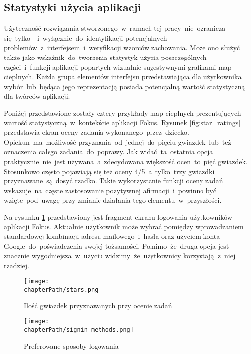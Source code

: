 \subsection{Statystyki użycia aplikacji}
Użyteczność rozwiązania stworzonego~w~ramach tej pracy~nie~ogranicza się~tylko~~i~wyłącznie~do~identyfikacji potencjalnych problemów~z~interfejsem~i~weryfikacji wzorców zachowania. Może ono służyć także jako wskaźnik~do~tworzenia statystyk użycia poszczególnych części~i~funkcji aplikacji popartych wizualnie sugestywnymi grafikami map cieplnych. Każda grupa elementów interfejsu przedstawiająca dla użytkownika wybór~lub~będąca jego reprezentacją posiada potencjalną wartość statystyczną dla twórców aplikacji.

Poniżej przedstawione zostały cztery przykłady map cieplnych prezentujących wartość statystyczną~w~kontekście aplikacji Fokus. Rysunek \ref{fig:star_ratings} przedstawia ekran oceny zadania wykonanego~przez~dziecko. Opiekun~ma~możliwość przyznania~od~jednej~do~pięciu gwiazdek~lub~też oznaczenia całego zadania~do~poprawy. Jak widać~ta~ostatnia opcja praktycznie~nie~jest używana~a~zdecydowana większość ocen~to~pięć gwiazdek. Stosunkowo często pojawiają się też oceny 4/5~a~tylko~trzy gwiazdki przyznawane~są~dosyć rzadko. Takie wykorzystanie funkcji oceny zadań wskazuje~na~częste zastosowanie pozytywnej afirmacji~i~powinno być wzięte~pod~uwagę przy zmianie działania tego elementu~w~przyszłości.

Na rysunku \ref{fig:signin_methods} przedstawiony jest fragment ekranu logowania użytkowników aplikacji Fokus. Aktualnie użytkownik może wybrać pomiędzy wprowadzaniem standardowej kombinacji adresu mailowego~i~hasła oraz użyciem konta Google~do~poświadczenia swojej tożsamości. Pomimo~że~druga opcja jest znacznie wygodniejsza~w~użyciu widzimy~że~użytkownicy korzystają~z~niej rzadziej.

\bigskip
\begin{figure}[H]
\centering
\begin{minipage}{.45\textwidth}
	\centering
	\texttt{[image: \\chapterPath/stars.png]}
	\bigskip
	\caption{Ilość gwiazdek przyznawanych przy ocenie zadań}
	\label{fig:star_ratings}
\end{minipage}
\begin{minipage}{.45\textwidth}
	\centering
	\texttt{[image: \\chapterPath/signin-methods.png]}
	\bigskip
	\caption{Preferowane sposoby logowania}
	\label{fig:signin_methods}
\end{minipage}
\end{figure}


